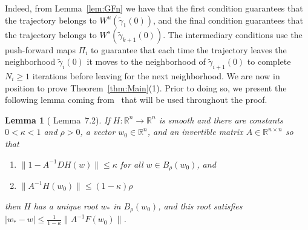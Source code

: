 \documentclass[11pt]{article}
\newcommand{\R}{\mathbb{R}}
\numberwithin{equation}{section}
\theoremstyle{plain}
\newtheorem{lem}[theorem]{Lemma}
\begin{document}
Indeed, from Lemma~\ref{lem:GFn} we have that the first condition guarantees that the trajectory belongs to $W^u(\tilde\gamma_1(0))$, and the final condition guarantees that the trajectory belongs to $W^s(\tilde\gamma_{k+1}(0))$. The intermediary conditions use the push-forward maps $\Pi_i$ to guarantee that each time the trajectory leaves the neighborhood $\tilde\gamma_i(0)$ it moves to the neighborhood of $\tilde\gamma_{i+1}(0)$ to complete $N_i \geq 1$ iterations before leaving for the next neighborhood. We are now in position to prove Theorem~\ref{thm:Main}(1). Prior to doing so, we present the following lemma coming from~\cite{RadialPulse} that will be used throughout the proof.

\begin{lem}[\cite{RadialPulse} Lemma~7.2]\label{lem:Roots} %
If $H:\R^n \to \R^n$ is smooth and there are constants $0 < \kappa < 1$ and $\rho > 0$, a vector $w_0 \in \R^n$, and an invertible matrix $A \in \R^{n\times n}$ so that
\begin{enumerate}
	\item $\|1 - A^{-1}DH(w)\| \leq \kappa$ for all $w \in B_\rho(w_0)$, and
	\item $\|A^{-1}H(w_0)\| \leq (1 - \kappa)\rho$
\end{enumerate}
then $H$ has a unique root $w_*$ in $B_\rho(w_0)$, and this root satisfies $|w_* - w| \leq \frac{1}{1-\kappa}\|A^{-1}F(w_0)\|$.
\end{lem}  
\end{document}
